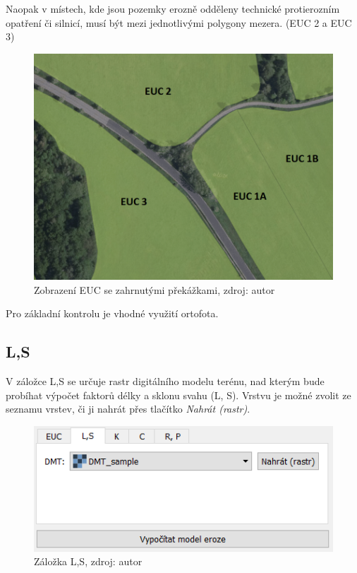 Naopak v místech, kde jsou pozemky erozně odděleny technické protierozním opatření či silnicí, musí být mezi jednotlivými polygony mezera. (EUC 2 a EUC 3)
\begin{figure}[H] \centering
		\includegraphics[width=.7\textwidth]{./pictures/rozdeleni_euc.png}
		\caption[Zobrazení EUC se zahrnutými překážkami]{Zobrazení EUC se zahrnutými překážkami, zdroj: autor}
		\label{rozdeleni_euc}
\end{figure}
Pro základní kontrolu je vhodné využití ortofota.
\subsection{L,S}
V záložce L,S se určuje rastr digitálního modelu terénu, nad kterým bude probíhat výpočet faktorů délky a sklonu svahu (L, S). Vrstvu je možné zvolit ze seznamu vrstev, či ji nahrát přes tlačítko \textit{Nahrát (rastr)}.
\begin{figure}[H] \centering
		\includegraphics[width=.6\textwidth]{./pictures/ls.png}
		\caption[Záložka L,S]{Záložka L,S, zdroj: autor}
		\label{zalozka_ls}
\end{figure}
